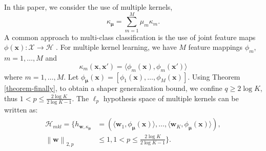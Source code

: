 \documentclass{article}
\begin{document}
In this paper, we consider the use of multiple kernels,
$$\kappa_{\bm \mu}=\sum_{m=1}^M \mu_m\kappa_m.$$
A common approach to multi-class classification is the use of joint feature
maps $\phi(\mathbf x):\mathcal X \to \mathcal H$ \cite{TsochantaridisHJA04}.
For multiple kernel learning, we have $M$ feature mappings $\phi_m$, $m=1,\ldots,M$ and
$$\kappa_m(\mathbf x,\mathbf x')=\langle \phi_m(\mathbf x), \phi_m(\mathbf x')\rangle$$ 
where $m=1,\ldots,M$.
Let $\phi_{\bm \mu}(\mathbf x)=[\phi_1(\mathbf x),\ldots,\phi_M(\mathbf x)]$.
Using Theorem \ref{theorem-finally}, to obtain a shaper generalization bound,
we confine $q \geq 2\log K$, thus $1 < p \leq \frac{2\log K}{2\log K-1}$.
The $\ell_p$ hypothesis space of multiple kernels can be written as:
 \begin{align*}
 \label{hypothspapcemkl}
   \begin{aligned}
   \mathcal{H}_{mkl}=\Big\{h_{\mathbf{w},\kappa_{\bm \mu}}&=\left(\langle \mathbf w_1,\phi_{\bm \mu}(\mathbf x)\rangle,\ldots, \langle\mathbf w_K,\phi_{\bm \mu}(\mathbf x)\rangle\right),\\
   \left\|\mathbf  w \right\|_{2,p}&\leq 1, 1 < p \leq \frac{2\log K}{2\log K-1}
  \Big\}.
   \end{aligned}
 \end{align*}

\end{document}
